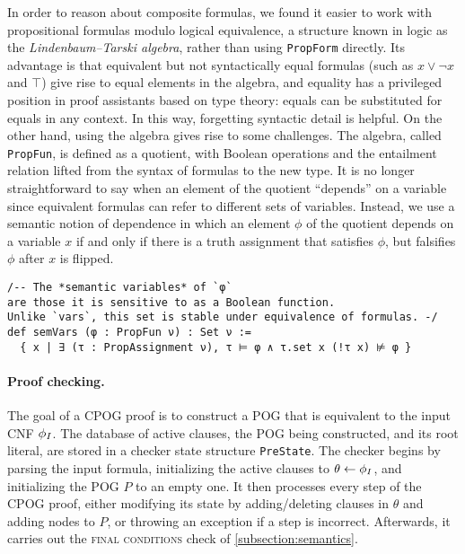 In order to reason about composite formulas,
we found it easier to work with propositional formulas modulo logical equivalence,
a structure known in logic as the \emph{Lindenbaum--Tarski algebra},
rather than using \lstinline{PropForm} directly.
Its advantage is that equivalent but not syntactically equal formulas
(such as $x \vee \neg x$ and $\top$)
give rise to equal elements in the algebra,
and equality has a privileged position in proof assistants based on type theory:
equals can be substituted for equals in any context.
In this way, forgetting syntactic detail is helpful.
On the other hand,
using the algebra gives rise to some challenges.
The algebra, called {\tt PropFun}, is defined as a quotient,
with Boolean operations and the entailment relation
lifted from the syntax of formulas to the new type.
It is no longer straightforward to say
when an element of the quotient ``depends'' on a variable
since equivalent formulas can refer to different sets of variables.
Instead, we use a semantic notion of dependence
in which an element $\phi$ of the quotient depends on a variable $x$
if and only if there is a truth assignment that satisfies $\phi$,
but falsifies $\phi$ after $x$ is flipped.
\begin{lstlisting}
/-- The *semantic variables* of `φ`
are those it is sensitive to as a Boolean function.
Unlike `vars`, this set is stable under equivalence of formulas. -/
def semVars (φ : PropFun ν) : Set ν :=
  { x | ∃ (τ : PropAssignment ν), τ ⊨ φ ∧ τ.set x (!τ x) ⊭ φ }
\end{lstlisting}

\paragraph{Proof checking.}
The goal of a CPOG proof is to construct a POG
that is equivalent to the input CNF $\phi_I$.
The database of active clauses,
the POG being constructed,
and its root literal,
are stored in a checker state structure {\tt PreState}.
The checker begins by parsing the input formula,
initializing the active clauses to $\theta \leftarrow \phi_I$,
and initializing the POG $P$ to an empty one.
It then processes every step of the CPOG proof,
either modifying its state by adding/deleting clauses in $\theta$
and adding nodes to $P$,
or throwing an exception if a step is incorrect.
Afterwards, it carries out the \textsc{final conditions} check of \ref{subsection:semantics}.

